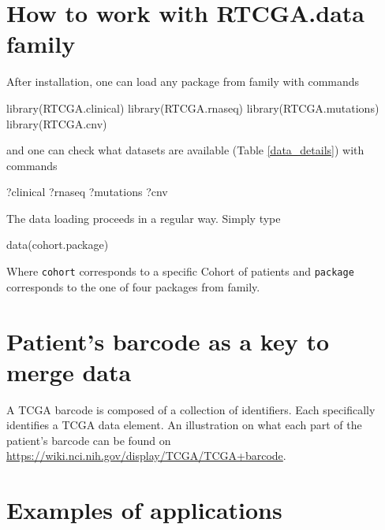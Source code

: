 \normalsize

\section{How to work with RTCGA.data
family}\label{how-to-work-with-rtcga.data-family}

After installation, one can load any package from 
family with commands

\begin{Schunk}
\begin{Sinput}
library(RTCGA.clinical)
library(RTCGA.rnaseq)
library(RTCGA.mutations)
library(RTCGA.cnv)
\end{Sinput}
\end{Schunk}

and one can check what datasets are available (Table \ref{data_details})
with commands

\begin{Schunk}
\begin{Sinput}
?clinical
?rnaseq
?mutations
?cnv
\end{Sinput}
\end{Schunk}

The data loading proceeds in a regular way. Simply type

\begin{Schunk}
\begin{Sinput}
data(cohort.package)
\end{Sinput}
\end{Schunk}

Where \texttt{cohort} corresponds to a specific Cohort of patients and
\texttt{package} corresponds to the one of four packages from
 family.

\section{Patient's barcode as a key to merge
data}\label{patients-barcode-as-a-key-to-merge-data}

A TCGA barcode is composed of a collection of identifiers. Each
specifically identifies a TCGA data element. An illustration on what
each part of the patient's barcode can be found on
\href{https://wiki.nci.nih.gov/display/TCGA/TCGA+barcode}{\url{https://wiki.nci.nih.gov/display/TCGA/TCGA+barcode}}.

\section{Examples of applications}\label{examples-of-applications}

